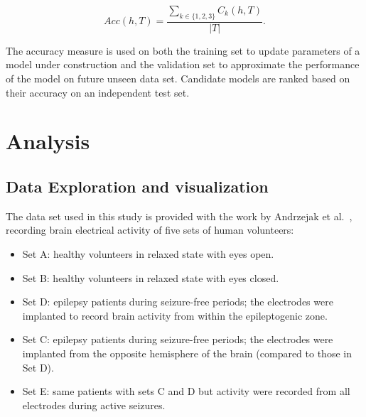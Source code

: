 \documentclass[12pt]{article}
\begin{document}
\[Acc(h, T) = \frac{\sum_{k\in\{1,2,3\}}C_k(h,T)}{|T|}.\]

The accuracy measure is used on both the training set to update parameters of a model under construction and the validation set to approximate the performance of the model on future unseen data set. Candidate models are ranked based on their accuracy on an independent test set.


\section{Analysis}

\subsection{Data Exploration and visualization}

\label{sec:data_set}
The data set used in this study is provided with the work by Andrzejak et al.~\cite{andrzejak2001indications}, recording brain electrical activity of five sets of human volunteers:
\begin{itemize}
\item Set A: healthy volunteers in relaxed state with eyes open.
\item Set B: healthy volunteers in relaxed state with eyes closed.
\item Set D: epilepsy patients during seizure-free periods; the electrodes were implanted to record brain activity from within the epileptogenic zone.
\item Set C: epilepsy patients during seizure-free periods; the electrodes were implanted from the opposite hemisphere of the brain (compared to those in Set D).
\item Set E: same patients with sets C and D but activity were recorded from all electrodes during active seizures.
\end{itemize}
\end{document}
